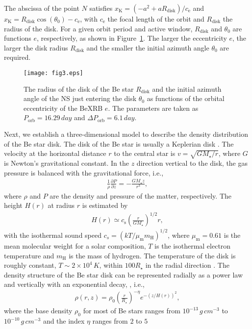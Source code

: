 \documentclass[twocolumn]{aastex62}
\begin{document}
The abscissa of the point $N$ satisfies $x_{\text{K}} = (-a^2+aR_{\text{disk}})/c_{\text{e}}$ and $x_{\text{K}}  = R_{\text{disk}} \cos(\theta_0) - c_{\text{e}}$, with $c_{\text{e}}$ the focal length of the orbit and $R_{\text{disk}}$ the radius of the disk. 
For a given orbit period and active window, $R_{\text{disk}}$ and  $\theta_0$ are functions $e$, respectively,
as shown in Figure~\ref{Rdisk}. The larger the eccentricity $e$, the larger the disk radius $R_{\text{disk}}$ and the smaller the initial azimuth angle $\theta_0$ are required.

\begin{figure}[htbp]
\centering
\texttt{[image: fig3.eps]}
\caption{The radius of the disk of the Be star $R_{\text{disk}}$ and the initial azimuth angle of the NS just entering the disk $\theta_0$ as functions of the orbital eccentricity of the BeXRB $e$.  
The parameters are taken as $P_{\text{orb}} = 16.29 \,\unit{day}$ and $\Delta P_{\text {orb}} = 6.1 \,\unit{day}. $}
\label{Rdisk}
\end{figure}

Next, we establish a three-dimensional model to describe the density distribution of the Be star disk.
The disk of the Be star is usually a Keplerian disk \citep[e.g.,][] {lee91, oka91, qui97, riv13}.
The velocity at the horizontal distance $r$ to the central star is $v = \sqrt{GM_{\star}/r}$, where $G$ is Newton’s gravitational constant. In the $z$ direction vertical to the disk, the gas pressure is balanced with the gravitational force, i.e.,
\begin{eqnarray}
\frac{1}{\rho}\frac{\partial P}{\partial z} = -\frac{GM_{\star}z}{r^3},
\end{eqnarray}
where $\rho$ and $P$ are the density and pressure of the matter, respectively. The height $H(r)$ at radius $r$ is estimated by
\begin{eqnarray}
H(r) \simeq c_{\mathrm{s}}\left(\frac{r}{G M_{\star}}\right)^{1 / 2} r,
\label{Hr}
\end{eqnarray}
with the isothermal sound speed $c_{s}=(k T/\mu_{\text{m}} m_{\mathrm{H}})^{1 / 2}$, where $\mu_{\text{m}} = 0.61$ is the mean molecular weight for a solar composition, $T$ is the isothermal electron temperature and $m_{\mathrm{H}}$  is the mass of hydrogen.
The temperature of the disk is roughly constant, $T \sim 2\times 10^4 \,\unit{K}$, within $100R_{\star}$ in the radial direction \citep[e.g.,][]{mil98, mil99}.
The density structure of the Be star disk can be represented radially as a power law and vertically with an exponential decay, \citep[e.g.,][]{mcg13}, i.e.,
\begin{eqnarray}
\rho(r, z)=\rho_{0}\left(\frac{r}{R_{\star}}\right)^{-\eta} e^{-(z / H(r))^{2}},
\label{diskdensity}
\end{eqnarray}
where the base density $\rho_0$ for most of Be stars ranges from $10^{-13}\,\unit{g\,cm^{-3}}$ to $10^{-10}\,\unit{g\,cm^{-3}}$ \citep[e.g.,][]{car07, jon08, tyc08} and the index $\eta$ ranges from $2$ to $5$ \citep[e.g.,][]{wat87, dou94}
\end{document}
